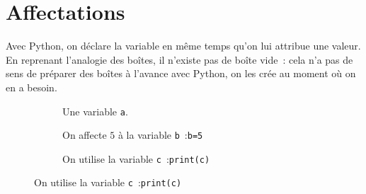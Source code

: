\section{Affectations}
Avec Python, on déclare la variable en même temps qu'on lui attribue une valeur. En reprenant
l'analogie des boîtes, il n'existe pas de boîte vide~: cela n'a pas de sens de préparer des boîtes
à l'avance avec Python, on les crée au moment où on en a besoin.

\begin{figure}
\caption{Une variable est une boîte étiquettée.}\label{python:variables}
\centering
\begin{subfigure}[t]{0.3\textwidth}
	\centering
	\caption{Une variable \texttt{a}.}
	\label{python:variables:figures:declaration}
	\end{subfigure}
	\quad
	\begin{subfigure}[t]{0.3\textwidth}
	\centering
	\caption{On affecte $5$ à la variable \texttt{b}~:\linebreak \texttt{b=5}}\label{python:variables:figures:affectation}
	\end{subfigure}
	\quad
	\begin{subfigure}[t]{0.3\textwidth}
	\centering
	\caption{On utilise la variable \texttt{c}~:\linebreak \texttt{print(c)}}\label{python:variables:figures:utilisation}
	\end{subfigure}
\end{figure}

